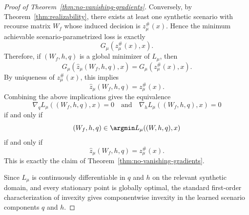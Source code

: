 \begin{proof}[Proof of Theorem~\ref{thm:no-vanishing-gradients}]
Conversely, by Theorem~\ref{thm:realizability}, there exists at least one synthetic scenario with recourse matrix $W_f$ whose induced decision is $z_\mu^\#(x)$. Hence the minimum achievable scenario-parametrized loss is exactly
\[
G_\mu(z_\mu^\#(x),x).
\]
Therefore, if $(W_f,h,q)$ is a global minimizer of $L_\mu$, then
\[
G_\mu(\hat z_\mu(W_f,h,q),x)
=
G_\mu(z_\mu^\#(x),x).
\]
By uniqueness of $z_\mu^\#(x)$, this implies
\[
\hat z_\mu(W_f,h,q)=z_\mu^\#(x).
\]
Combining the above implications gives the equivalence
\[
\nabla_q L_\mu((W_f,h,q),x)=0
\quad\text{and}\quad
\nabla_h L_\mu((W_f,h,q),x)=0
\]
if and only if
\[
(W_f,h,q)\in\argmin L_\mu((W,h,q),x)
\]
if and only if
\[
\hat z_\mu(W_f,h,q)=z_\mu^\#(x).
\]
This is exactly the claim of Theorem~\ref{thm:no-vanishing-gradients}.

Since $L_\mu$ is continuously differentiable in $q$ and $h$ on the relevant synthetic domain, and every stationary point is globally optimal, the standard first-order characterization of invexity gives componentwise invexity in the learned scenario components $q$ and $h$.
\end{proof}
